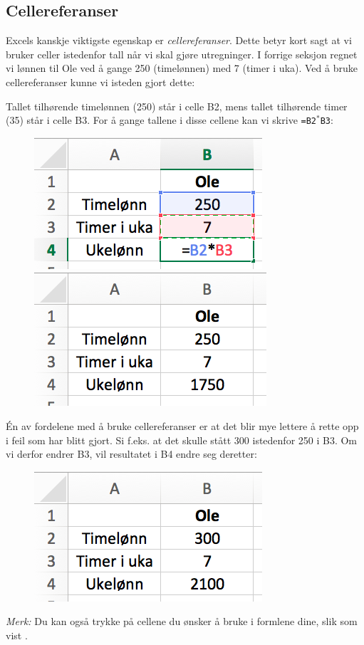 \subsection{Cellereferanser}
Excels kanskje viktigste egenskap er \textit{cellereferanser}. Dette betyr kort sagt at vi bruker celler istedenfor tall når vi skal gjøre utregninger. I forrige seksjon regnet vi lønnen til Ole ved å gange 250 (timelønnen) med 7 (timer i uka). Ved å bruke cellereferanser kunne vi isteden gjort dette:\vsk

Tallet tilhørende timelønnen (250) står i celle B2, mens tallet tilhørende timer (35) står i celle B3. For å gange tallene i disse cellene kan vi skrive {\tt =B2$ ^* $B3}: 

\begin{figure}[H]
	\centering
	\includegraphics[scale=0.3]{figs/ex5}\qquad
	\includegraphics[scale=0.3]{figs/ex4}
\end{figure}
Én av fordelene med å bruke cellereferanser er at det blir mye lettere å rette opp i feil som har blitt gjort. Si f.eks. at det skulle stått 300 istedenfor 250 i B3. Om vi derfor endrer B3, vil resultatet i B4 endre seg deretter:
\begin{figure}[H]
	\centering
	\includegraphics[scale=0.3]{figs/ex6}
\end{figure}
\textsl{Merk:} Du kan også trykke på cellene du ønsker å bruke i formlene dine, slik som vist .
